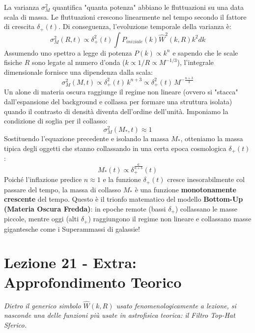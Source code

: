\documentclass[11pt,a4paper]{report}
\begin{document}
La varianza $\sigma_M^2$ quantifica "quanta potenza" abbiano le fluttuazioni su una data scala di massa. Le fluttuazioni crescono linearmente nel tempo secondo il fattore di crescita $\delta_+(t)$. Di conseguenza, l'evoluzione temporale della varianza è:
\begin{equation}
\sigma_M^2(R, t) \propto \delta_+^2(t) \int P_{iniziale}(k) \hat{W}^2(k, R) k^2 dk
\end{equation}
Assumendo uno spettro a legge di potenza $P(k) \propto k^n$ e sapendo che le scale fisiche $R$ sono legate al numero d'onda ($k \propto 1/R \propto M^{-1/3}$), l'integrale dimensionale fornisce una dipendenza dalla scala:
\begin{equation}
\sigma_M^2(M, t) \propto \delta_+^2(t) \, k^{n+3} \propto \delta_+^2(t) \, M^{-\frac{n+3}{3}}
\end{equation}
Un alone di materia oscura raggiunge il regime non lineare (ovvero si "stacca" dall'espansione del background e collassa per formare una struttura isolata) quando il contrasto di densità diventa dell'ordine dell'unità. Imponiamo la condizione di soglia per il collasso:
\begin{equation}
\sigma_M^2(M_*, t) \approx 1
\end{equation}
Sostituendo l'equazione precedente e isolando la massa $M_*$, otteniamo la massa tipica degli oggetti che stanno collassando in una certa epoca cosmologica $\delta_+(t)$:
\begin{equation}
M_*(t) \propto \delta_+^{\frac{6}{n+3}}(t)
\end{equation}
Poiché l'inflazione predice $n \approx 1$ e la funzione $\delta_+(t)$ cresce inesorabilmente col passare del tempo, la massa di collasso $M_*$ è una funzione \textbf{monotonamente crescente} del tempo. Questo è il trionfo matematico del modello \textbf{Bottom-Up (Materia Oscura Fredda)}: in epoche remote (bassi $\delta_+$) collassano le masse piccole, mentre oggi (alti $\delta_+$) raggiungono il regime non lineare e collassano masse gigantesche come i Superammassi di galassie!

\newpage
\section{Lezione 21 - Extra: Approfondimento Teorico}

\textit{Dietro il generico simbolo $\hat{W}(k, R)$ usato fenomenologicamente a lezione, si nasconde una delle funzioni più usate in astrofisica teorica: il Filtro Top-Hat Sferico.}
\end{document}
